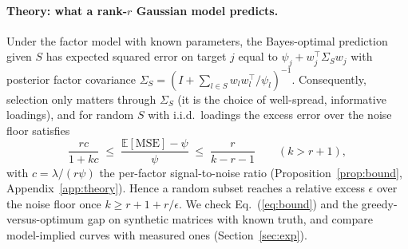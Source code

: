 \paragraph{Theory: what a rank-$r$ Gaussian model predicts.}
Under the factor model with known parameters, the Bayes-optimal prediction given $S$ has expected squared error on target $j$ equal to $\psi_j+w_j^\top\Sigma_S w_j$ with posterior factor covariance $\Sigma_S=(I+\sum_{l\in S}w_lw_l^\top/\psi_l)^{-1}$. Consequently, selection only matters through $\Sigma_S$ (it is the choice of well-spread, informative loadings), and for random $S$ with i.i.d.\ loadings the excess error over the noise floor satisfies
\begin{equation}
\frac{rc}{1+kc}\;\le\;\frac{\mathbb E[\mathrm{MSE}]-\psi}{\psi}\;\le\;\frac{r}{k-r-1}\qquad(k>r+1),
\label{eq:bound}
\end{equation}
with $c=\lambda/(r\psi)$ the per-factor signal-to-noise ratio (Proposition~\ref{prop:bound}, Appendix~\ref{app:theory}). Hence a random subset reaches a relative excess $\epsilon$ over the noise floor once $k\ge r+1+r/\epsilon$. We check Eq.~(\ref{eq:bound}) and the greedy-versus-optimum gap on synthetic matrices with known truth, and compare model-implied curves with measured ones (Section~\ref{sec:exp}).

